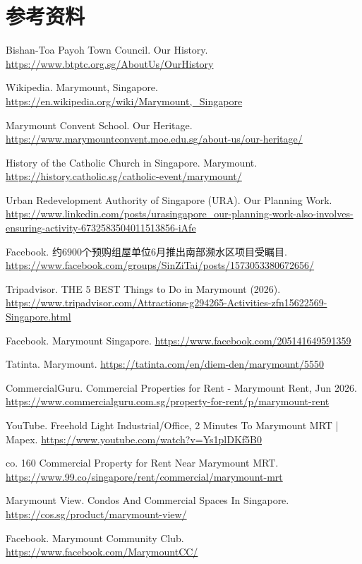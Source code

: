 \documentclass[11pt,a4paper,twoside,openany]{book}
\begin{document}
\section*{参考资料}
\begin{enumerate}[label={[\arabic*]},leftmargin=*,topsep=2pt,itemsep=1pt,parsep=0pt]
  \item Bishan-Toa Payoh Town Council. Our History. \url{https://www.btptc.org.sg/AboutUs/OurHistory}
  \item Wikipedia. Marymount, Singapore. \url{https://en.wikipedia.org/wiki/Marymount,_Singapore}
  \item Marymount Convent School. Our Heritage. \url{https://www.marymountconvent.moe.edu.sg/about-us/our-heritage/}
  \item History of the Catholic Church in Singapore. Marymount. \url{https://history.catholic.sg/catholic-event/marymount/}
  \item Urban Redevelopment Authority of Singapore (URA). Our Planning Work. \url{https://www.linkedin.com/posts/urasingapore_our-planning-work-also-involves-ensuring-activity-6732583504011513856-iAfe}
  \item Facebook. 约6900个预购组屋单位6月推出南部濒水区项目受瞩目. \url{https://www.facebook.com/groups/SinZiTai/posts/1573053380672656/}
  \item Tripadvisor. THE 5 BEST Things to Do in Marymount (2026). \url{https://www.tripadvisor.com/Attractions-g294265-Activities-zfn15622569-Singapore.html}
  \item Facebook. Marymount Singapore. \url{https://www.facebook.com/205141649591359}
  \item Tatinta. Marymount. \url{https://tatinta.com/en/diem-den/marymount/5550}
  \item CommercialGuru. Commercial Properties for Rent - Marymount Rent, Jun 2026. \url{https://www.commercialguru.com.sg/property-for-rent/p/marymount-rent}
  \item YouTube. Freehold Light Industrial/Office, 2 Minutes To Marymount MRT | Mapex. \url{https://www.youtube.com/watch?v=Ys1plDKf5B0}
  \item co. 160 Commercial Property for Rent Near Marymount MRT. \url{https://www.99.co/singapore/rent/commercial/marymount-mrt}
  \item Marymount View. Condos And Commercial Spaces In Singapore. \url{https://cos.sg/product/marymount-view/}
  \item Facebook. Marymount Community Club. \url{https://www.facebook.com/MarymountCC/}

\end{enumerate}
\end{document}
